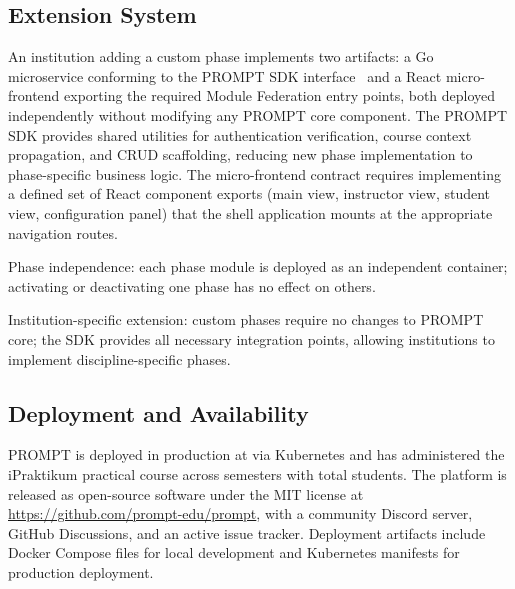\subsection{Extension System}

An institution adding a custom phase implements two artifacts:
a Go microservice conforming to the PROMPT SDK interface~\cite{prompt-sdk} and a React micro-frontend exporting the required Module Federation entry points, both deployed independently without modifying any PROMPT core component.
The PROMPT SDK provides shared utilities for authentication verification, course context propagation, and CRUD scaffolding, reducing new phase implementation to phase-specific business logic.
The micro-frontend contract requires implementing a defined set of React component exports (main view, instructor view, student view, configuration panel) that the shell application mounts at the appropriate navigation routes.

\begin{fulfillment}
Phase independence: each phase module is deployed as an independent container; activating or deactivating one phase has no effect on others.
\end{fulfillment}

\begin{fulfillment}
Institution-specific extension: custom phases require no changes to PROMPT core; the SDK provides all necessary integration points, allowing institutions to implement discipline-specific phases.
\end{fulfillment}

\subsection{Deployment and Availability}

PROMPT is deployed in production at \university{} via Kubernetes and has administered the iPraktikum practical course across  semesters with  total students.
The platform is released as open-source software under the MIT license at \url{https://github.com/prompt-edu/prompt}, with a community Discord server, GitHub Discussions, and an active issue tracker.
Deployment artifacts include Docker Compose files for local development and Kubernetes manifests for production deployment.
